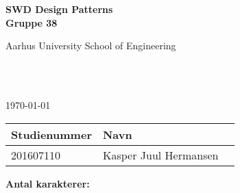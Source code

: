 \begin{center}
	{\fontsize{36pt}{0}\selectfont
		\textbf{
		SWD Design Patterns\\
		Gruppe 38\\
		}
	}
	\vspace{20pt}

	{\fontsize{14pt}{0}\selectfont
		Aarhus University School of Engineering\\
	}
	\vspace{20pt}

	{\fontsize{24pt}{0}\selectfont
		\thetitle\\
	}
	\vspace{20pt}

	{\fontsize{18pt}{0}\selectfont
		\ifdefined\frontpageDate
			\frontpageDate\\
		\else
			\today\\
		\fi
	}
	\vspace{20pt}

	\vspace{5pt}
	\begin{tabular}{|l|l|l|}
		\hline
		\rowcolor{gray!50}
		\textbf{Studienummer} & \textbf{Navn}\\ [5px]
		\hline
		201607110 & Kasper Juul Hermansen\\
		\hline
	\end{tabular}

	\ifdefined\frontpageCharacters
		\vspace{10pt}
		\textbf{Antal karakterer: } \frontpageCharacters\\
	\fi
	\vspace{30pt}

\end{center}
